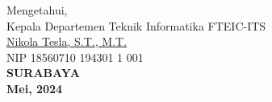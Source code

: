 \vspace{\fill}

\begin{center}
  Mengetahui,\\
  Kepala Departemen Teknik Informatika FTEIC-ITS\\
  \vspace{10ex}
  \underline{Nikola Tesla, S.T., M.T. }\\
  NIP 18560710 194301 1 001\\
  \vspace{10ex}
  \textbf{SURABAYA} \\
  \textbf{Mei, 2024}
\end{center}
\endgroup
